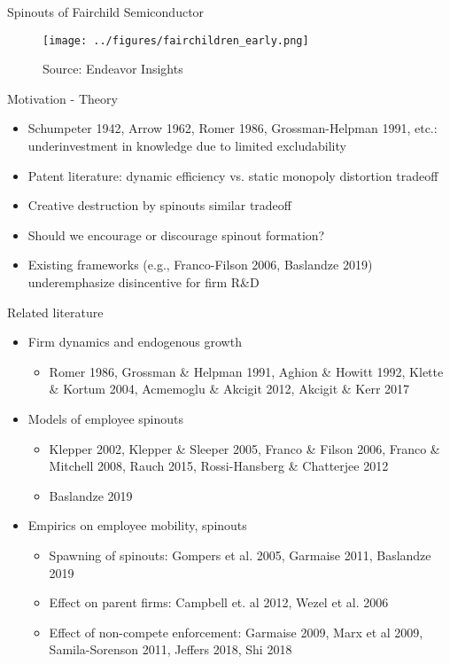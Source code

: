 \documentclass[english,usenames,dvipsnames]{beamer}
\begin{document}
\begin{frame}{Spinouts of Fairchild Semiconductor}
\begin{figure}
	\texttt{[image: ../figures/fairchildren\_early.png]}
	\caption{Source: Endeavor Insights}
\end{figure}
\end{frame}

\begin{frame}{Motivation - Theory}
\label{theory_big_picture}
\begin{itemize}
	\item Schumpeter 1942, Arrow 1962, Romer 1986, Grossman-Helpman 1991, etc.: \alert{underinvestment} in knowledge due to \alert{limited excludability}
	\item Patent literature: dynamic efficiency vs. static monopoly distortion tradeoff
	\item Creative destruction by spinouts similar tradeoff
	\item Should we encourage or discourage spinout formation?
	\item Existing frameworks (e.g., Franco-Filson 2006, Baslandze 2019) underemphasize disincentive for firm R\&D 
\end{itemize}
\end{frame}

\begin{frame}{Related literature}
\begin{itemize}
	\item Firm dynamics and endogenous growth
	\begin{itemize}
		\item Romer 1986, Grossman \& Helpman 1991, Aghion \& Howitt 1992, Klette \& Kortum 2004, Acmemoglu \& Akcigit 2012, Akcigit \& Kerr 2017
	\end{itemize}
	\item Models of employee spinouts
	\begin{itemize}
		\item Klepper 2002, Klepper \& Sleeper 2005, Franco \& Filson 2006, Franco \& Mitchell 2008, Rauch 2015, Rossi-Hansberg \& Chatterjee 2012
		\item Baslandze 2019
	\end{itemize}
	\item Empirics on employee mobility, spinouts
	\begin{itemize}
		\item Spawning of spinouts: Gompers et al. 2005, Garmaise 2011, Baslandze 2019
		\item Effect on parent firms: Campbell et. al 2012, Wezel et al. 2006
		\item Effect of non-compete enforcement: Garmaise 2009, Marx et al 2009, Samila-Sorenson 2011, Jeffers 2018, Shi 2018
	\end{itemize}
\end{itemize}
\end{frame}
\end{document}
